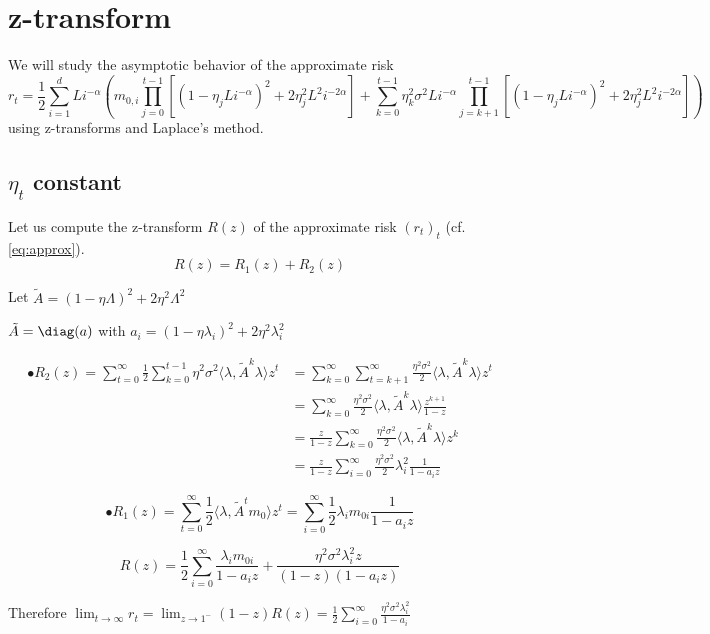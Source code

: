 \section{z-transform}

We will study the asymptotic behavior of the approximate risk\[r_t = \frac{1}{2} \sum_{i=1}^d Li^{-\alpha} \left( m_{0,i} \prod_{j=0}^{t-1} \left[ (1-\eta_j Li^{-\alpha})^2+2\eta_j^2 L^2 i^{-2\alpha} \right] + \sum_{k=0}^{t-1} \eta_k^2 \sigma^2 Li^{-\alpha} \prod_{j=k+1}^{t-1} \left[ (1-\eta_j Li^{-\alpha})^2+2\eta_j^2 L^2 i^{-2\alpha} \right] \right)\]using z-transforms and Laplace's method.



\subsection{$\eta_t$ constant}

Let us compute the z-transform $R(z)$ of the approximate risk $(r_t)_t$ (cf. \ref{eq:approx}).
\[
R(z) = R_1(z) + R_2(z)
\]

Let $\tilde A =  (1-\eta\Lambda)^2+2\eta^2 \Lambda^2$

$\tilde A = \diag(a)$ with $a_i = (1-\eta\lambda_i)^2+2\eta^2 \lambda_i^2$

\begin{align*}
\bullet R_2(z)= \sum_{t=0}^{\infty} \frac{1}{2} \sum_{k=0}^{t-1} \eta^2 \sigma^2 \langle \lambda, \tilde A^k \lambda \rangle z^t 
&= \sum_{k=0}^{\infty} \sum_{t=k+1}^{\infty} \frac{\eta^2 \sigma^2}{2} \langle \lambda, \tilde A^k \lambda \rangle z^t \\
&= \sum_{k=0}^{\infty} \frac{\eta^2 \sigma^2}{2} \langle \lambda, \tilde A^k \lambda \rangle \frac{z^{k+1}}{1-z} \\
&= \frac{z}{1-z} \sum_{k=0}^{\infty} \frac{\eta^2 \sigma^2}{2} \langle \lambda, \tilde A^k \lambda \rangle z^k\\
&=\frac{z}{1-z} \sum_{i=0}^{\infty} \frac{\eta^2 \sigma^2}{2} \lambda_i^2 \frac{1}{1-a_iz}
\end{align*}


\[
\bullet R_1(z)=\sum_{t=0}^{\infty} \frac{1}{2} \langle \lambda, \tilde A^t m_0 \rangle z^t = \sum_{i=0}^{\infty} \frac{1}{2} \lambda_i m_{0i} \frac{1}{1-a_iz}
\]

\[ R(z)=\frac{1}{2} \sum_{i=0}^{\infty}  \frac{\lambda_i m_{0i}}{1-a_iz} +  \frac{\eta^2 \sigma^2 \lambda_i^2 z}{(1-z)(1-a_iz)}
\]

Therefore $\displaystyle \lim_{t\to \infty} r_t =  \lim_{z\to 1^-} (1-z) R(z) = \frac{1}{2}\sum_{i=0}^\infty    \frac{\eta^2 \sigma^2 \lambda_i^2}{1-a_i}$



